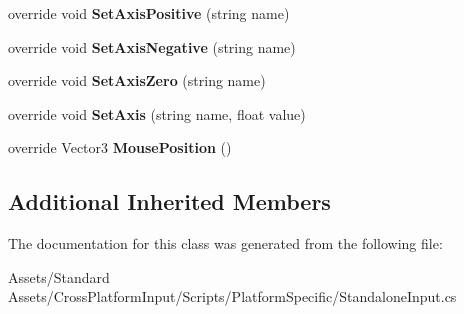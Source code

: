 \begin{DoxyCompactItemize}
\item 
override void {\bfseries Set\+Axis\+Positive} (string name)\hypertarget{class_unity_standard_assets_1_1_cross_platform_input_1_1_platform_specific_1_1_standalone_input_a045d6d8118178037cca1552c087f4598}{}\label{class_unity_standard_assets_1_1_cross_platform_input_1_1_platform_specific_1_1_standalone_input_a045d6d8118178037cca1552c087f4598}

\item 
override void {\bfseries Set\+Axis\+Negative} (string name)\hypertarget{class_unity_standard_assets_1_1_cross_platform_input_1_1_platform_specific_1_1_standalone_input_ab657b9df7411909f1319c7ecf918689c}{}\label{class_unity_standard_assets_1_1_cross_platform_input_1_1_platform_specific_1_1_standalone_input_ab657b9df7411909f1319c7ecf918689c}

\item 
override void {\bfseries Set\+Axis\+Zero} (string name)\hypertarget{class_unity_standard_assets_1_1_cross_platform_input_1_1_platform_specific_1_1_standalone_input_a94bfadda9797a34c9d66b30dd6449c2c}{}\label{class_unity_standard_assets_1_1_cross_platform_input_1_1_platform_specific_1_1_standalone_input_a94bfadda9797a34c9d66b30dd6449c2c}

\item 
override void {\bfseries Set\+Axis} (string name, float value)\hypertarget{class_unity_standard_assets_1_1_cross_platform_input_1_1_platform_specific_1_1_standalone_input_a1597873a4a9309a388a3e9239e2632d7}{}\label{class_unity_standard_assets_1_1_cross_platform_input_1_1_platform_specific_1_1_standalone_input_a1597873a4a9309a388a3e9239e2632d7}

\item 
override Vector3 {\bfseries Mouse\+Position} ()\hypertarget{class_unity_standard_assets_1_1_cross_platform_input_1_1_platform_specific_1_1_standalone_input_a18dc43a362728639b76870ef6e141576}{}\label{class_unity_standard_assets_1_1_cross_platform_input_1_1_platform_specific_1_1_standalone_input_a18dc43a362728639b76870ef6e141576}

\end{DoxyCompactItemize}
\subsection*{Additional Inherited Members}


The documentation for this class was generated from the following file\+:\begin{DoxyCompactItemize}
\item 
Assets/\+Standard Assets/\+Cross\+Platform\+Input/\+Scripts/\+Platform\+Specific/Standalone\+Input.\+cs\end{DoxyCompactItemize}
